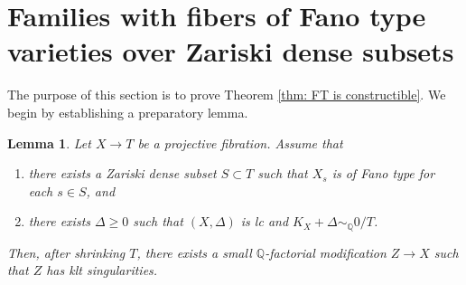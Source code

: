 \documentclass[11pt,oneside,reqno]{amsart}
\numberwithin{equation}{section}
\newtheorem{lemma}[proposition]{Lemma}
\theoremstyle{definition}
\newcommand{\bQ}{\mathbb{Q}}
\begin{document}
\section{Families with fibers of Fano type varieties over Zariski dense subsets}\label{sec: FT in family}

The purpose of this section is to prove Theorem \ref{thm: FT is constructible}. We begin by establishing a preparatory lemma.

\begin{lemma}\label{lem: small q-fact}
Let $X \to T$ be a projective fibration. Assume that 
\begin{enumerate}
\item there exists a Zariski dense subset $S \subset T$ such that $X_s$ is of Fano type for each $s\in S$, and
\item there exists $\Delta\geq 0$ such that $(X, \Delta)$ is lc and $K_X+\Delta\sim_{\bQ}0/T$.
\end{enumerate}
Then, after shrinking $T$, there exists a small $\bQ$-factorial modification $Z \to X$ such that $Z$ has klt singularities.
\end{lemma}
\end{document}
